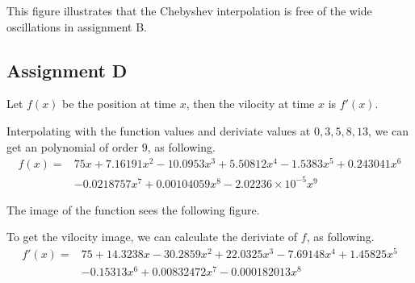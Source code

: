 \documentclass[11pt,en]{elegantpaper}
\begin{document}
\begin{center}
\end{center}

This figure illustrates that the Chebyshev interpolation is free of the wide oscillations in assignment B.

\subsection{Assignment D}

Let $f(x)$ be the position at time $x$, then the vilocity at time $x$ is $f'(x)$.

Interpolating with the function values and deriviate values at $0,3,5,8,13$, we can get an polynomial of order $9$, as following.
\begin{align*}
  f(x)=&75x+7.16191x^{2}-10.0953x^{3}+5.50812x^{4}-1.5383x^{5}+0.243041x^{6}\\
  &-0.0218757x^{7}+0.00104059x^{8}-2.02236\times 10^{-5}x^{9}
\end{align*}

The image of the function sees the following figure.

\begin{center}
\end{center}

To get the vilocity image, we can calculate the deriviate of $f$, as following.
\begin{align*}
  f'(x)=&75+14.3238x-30.2859x^{2}+22.0325x^{3}-7.69148x^{4}+1.45825x^{5}\\
  &-0.15313x^{6}+0.00832472x^{7}-0.000182013x^{8}
\end{align*}
\end{document}
